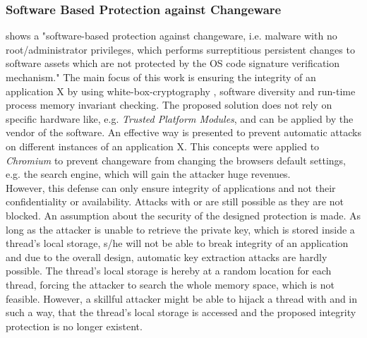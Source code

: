 \subsubsection{Software Based Protection against Changeware}
\cite{changeware} shows a "software-based protection against changeware, i.e. malware with no root/administrator privileges, which performs surreptitious persistent changes to software assets which are not protected by the OS code signature verification mechanism." The main focus of this work is ensuring the integrity of an application X by using white-box-cryptography \cite{wbcrypto}, software diversity \cite{Forrest} and run-time process memory invariant checking. The proposed solution does not rely on specific hardware like, e.g. \emph{Trusted Platform Modules}, and can be applied by the vendor of the software. An effective way is presented to prevent automatic attacks on different instances of an application X. This concepts were applied to \emph{Chromium} to prevent changeware from changing the browsers default settings, e.g. the search engine, which will gain the attacker huge revenues.\\
However, this defense can only ensure integrity of applications and not their confidentiality or availability. Attacks with  or  are still possible as they are not blocked. An assumption about the security of the designed protection is made. As long as the attacker is unable to retrieve the private key, which is stored inside a thread's local storage, s/he will not be able to break integrity of an application and due to the overall design, automatic key extraction attacks are hardly possible. The thread's local storage is hereby at a random location for each thread, forcing the attacker to search the whole memory space, which is not feasible. However, a skillful attacker might be able to hijack a thread with  and  in such a way, that the thread's local storage is accessed and the proposed integrity protection is no longer existent.